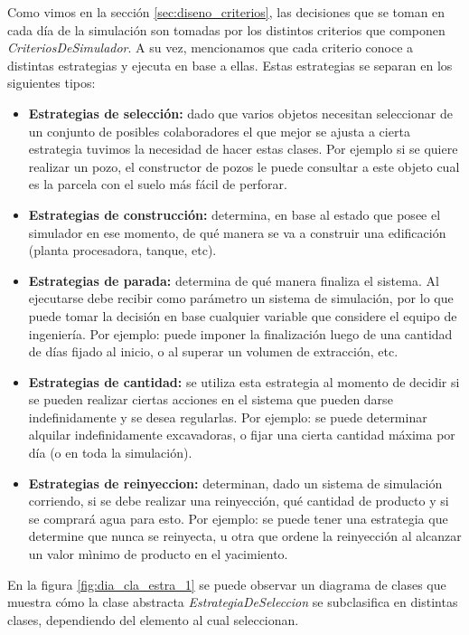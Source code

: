 \par Como vimos en la sección \ref{sec:diseno_criterios}, las decisiones que se toman en cada día de la simulación son tomadas por los distintos criterios que componen \textit{CriteriosDeSimulador}. A su vez, mencionamos que cada criterio conoce a distintas estrategias y ejecuta en base a ellas. Estas estrategias se separan en los siguientes tipos:
\begin{itemize}
  \item \textbf{Estrategias de selección:} dado que varios objetos necesitan seleccionar de un conjunto de posibles colaboradores el que mejor se ajusta a cierta estrategia tuvimos la necesidad de hacer estas clases. Por ejemplo si se quiere realizar un pozo, el constructor de pozos le puede consultar a este objeto cual es la parcela con el suelo más fácil de perforar.
  \item \textbf{Estrategias de construcción:} determina, en base al estado que posee el simulador en ese momento, de qué manera se va a construir una edificación (planta procesadora, tanque, etc). 
  \item \textbf{Estrategias de parada:} determina de qué manera finaliza el sistema. Al ejecutarse debe recibir como parámetro un sistema de simulación, por lo que puede tomar la decisión en base cualquier variable que considere el equipo de ingeniería. Por ejemplo: puede imponer la finalización luego de una cantidad de días fijado al inicio, o al superar un volumen de extracción, etc. 
  \item \textbf{Estrategias de cantidad:} se utiliza esta estrategia al momento de decidir si se pueden realizar ciertas acciones en el sistema que pueden darse indefinidamente y se desea regularlas. Por ejemplo: se puede determinar alquilar indefinidamente excavadoras, o fijar una cierta cantidad máxima por día (o en toda la simulación).
  \item \textbf{Estrategias de reinyeccion:} determinan, dado un sistema de simulación corriendo, si se debe realizar una reinyección, qué cantidad de producto y si se comprará agua para esto. Por ejemplo: se puede tener una estrategia que determine que nunca se reinyecta, u otra que ordene la reinyección al alcanzar un valor mìnimo de producto en el yacimiento. 
\end{itemize}

\par En la figura \ref{fig:dia_cla_estra_1} se puede observar un diagrama de clases que muestra cómo la clase abstracta \textit{EstrategiaDeSeleccion} se subclasifica en distintas clases, dependiendo del elemento al cual seleccionan.

